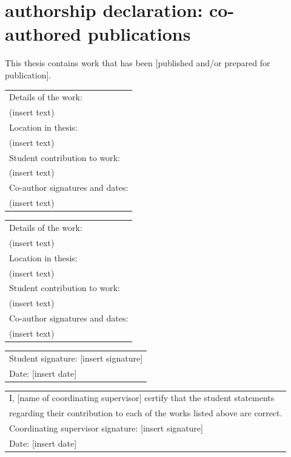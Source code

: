\documentclass{book}
\begin{document}
\section*{authorship declaration: co-authored publications}
\begin{flushleft}
	This thesis contains work that has been [published and/or prepared for publication]. 
	\vskip 0.5cm
	\begin{tabular}{l}
		Details of the work: \\
		(insert text)      \\ 
		Location in thesis: \\
		(insert text)      \\ 
		Student contribution to work: \\
		(insert text) \\
		Co-author signatures and dates: \\
		(insert text)
	\end{tabular} 
	\vskip 0.5cm
	\begin{tabular}{l}
		Details of the work: \\
		(insert text)      \\ 
		Location in thesis: \\
		(insert text)      \\ 
		Student contribution to work: \\
		(insert text) \\
		Co-author signatures and dates: \\
		(insert text)
	\end{tabular} 
	\vskip 0.5cm
	\begin{tabular}{l}
		Student signature: [insert signature] \\
		Date: [insert date]\\
	\end{tabular}
	\vskip 0.5cm
	\begin{tabular}{l}
		I, [name of coordinating supervisor] certify that the student statements \\ regarding their contribution to each of the works listed above are correct. \\
		Coordinating supervisor signature: [insert signature]\\
		Date: [insert date]
	\end{tabular}
\end{flushleft}
\end{document}

